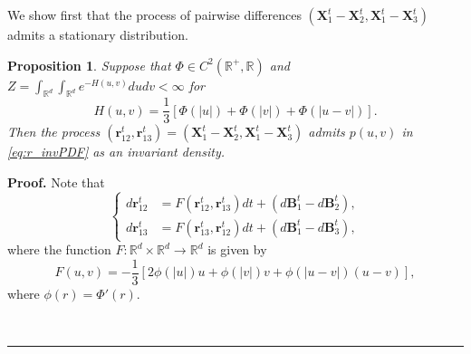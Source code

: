 \documentclass[]{elsarticle}
\def\R{\mathbb{R}}
\newcommand{\mbf}[1]{\boldsymbol{#1}}
\newcommand{\br}{\mbf{r}}
\newcommand{\bB}{\mbf{B}}
\newcommand{\bX}{\mbf{X}}
\newtheorem{proposition}[theorem]{Proposition}
\newenvironment{proof}[1][Proof]{\noindent\textbf{#1.} }{\ \rule{0.5em}{0.5em}}
\numberwithin{equation}{section}
\numberwithin{theorem}{section}
\begin{document}
We show first that the process of pairwise differences $(\bX^t_1-\bX^t_2, \bX^t_1-\bX^t_3)$ admits a stationary distribution. 
\begin{proposition} \label{prop_staionary_r}
Suppose that $\Phi\in C^2(\R^+,\R)$ and $Z= \int_{\R^d}\int_{\R^d} e^{-H(u,v)} du dv< \infty$ for 
\[
H(u,v) =\frac{1}{3} [\Phi(|u|)+ \Phi(|v|)+ \Phi(|u-v|)].
\]
Then the process  $(\br^t_{12},\br^t_{13}) =  (\bX^t_1-\bX^t_2, \bX^t_1-\bX^t_3)$ admits $p(u,v)$ in \eqref{eq:r_invPDF} as an invariant density. 

\end{proposition}
\begin{proof}
Note that 
\begin{equation} \label{sys:r_ij}
\left \{
\begin{array}{ll}
    d\br^t_{12}& = F(\br^t_{12}, \br^t_{13})dt + (d\bB^t_1-d\bB^t_2),   \\
    d\br^t_{13}& = F(\br^t_{13}, \br^t_{12})dt + (d\bB^t_1-d\bB^t_3)  ,
\end{array}  
\right.
\end{equation}
where the function $F:\R^d\times \R^d\to \R^d$ is given by 
\[
F(u,v) = - \frac{1}{3} [2\phi(|u|)u +\phi(|v|)v +\phi(|u-v|)(u-v)  ],
\]
where $\phi(r)= \Phi'(r)$. 


\end{proof}
\end{document}
